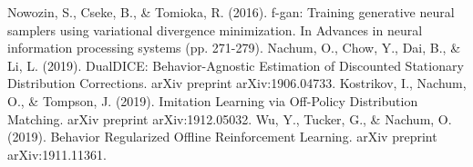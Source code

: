 \documentclass[a4paper]{article}
\theoremstyle{definition}
\begin{document}
\begin{thebibliography}{99}  
Nowozin, S., Cseke, B., \& Tomioka, R. (2016). f-gan: Training generative neural samplers using variational divergence minimization. In Advances in neural information processing systems (pp. 271-279).  
Nachum, O., Chow, Y., Dai, B., \& Li, L. (2019). DualDICE: Behavior-Agnostic Estimation of Discounted Stationary Distribution Corrections. arXiv preprint arXiv:1906.04733.
Kostrikov, I., Nachum, O., \& Tompson, J. (2019). Imitation Learning via Off-Policy Distribution Matching. arXiv preprint arXiv:1912.05032.
Wu, Y., Tucker, G., \& Nachum, O. (2019). Behavior Regularized Offline Reinforcement Learning. arXiv preprint arXiv:1911.11361.
\end{thebibliography}
\end{document}
